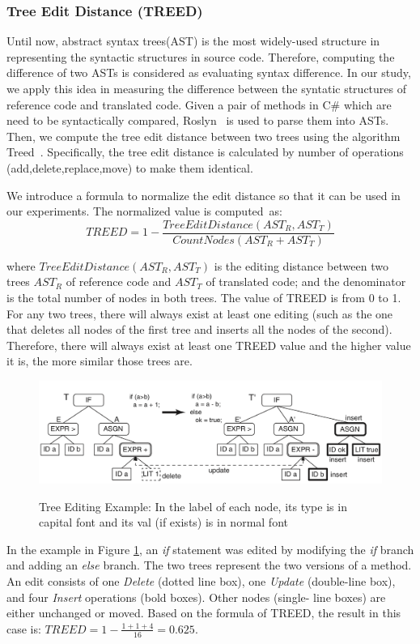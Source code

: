 \subsubsection{\textbf{Tree Edit Distance (TREED)}}  
Until now, abstract syntax trees(AST) is the most widely-used
structure in representing the syntactic structures in source
code. Therefore, computing the difference of two ASTs is considered as
evaluating syntax difference.  In our study, we apply this idea in
measuring the difference between the syntatic structures of reference
code and translated code. Given a pair of methods in C\# which are
need to be syntactically compared, Roslyn~\cite{tien} is used to parse
them into ASTs. Then, we compute the tree edit distance between two
trees using the algorithm Treed~\cite{oopsla10}.  Specifically, the
tree edit distance is calculated by number of operations
(add,delete,replace,move) to make them identical.

We introduce a formula to normalize the edit distance so that it can
be used in our experiments. The normalized value is computed~as:
\[TREED = 1 -  \frac{TreeEditDistance\left(AST_R, AST_T\right)}{CountNodes \left(AST_R+AST_T\right)}\] 
  
where $TreeEditDistance\left(AST_R, AST_T\right)$ is the editing
distance between two trees $AST_R$ of reference code and $AST_T$ of
translated code; and the denominator is the total number of nodes in
both trees. The value of TREED is from 0 to 1.
%
For any two trees, there will always exist at least one editing (such
as the one that deletes all nodes of the first tree and inserts all
the nodes of the second). Therefore, there will always exist at least
one TREED value and the higher value it is, the more similar those
trees are.

\begin{figure}[h]
	\caption{Tree Editing Example: In the label of each node, its type is in capital font and its val (if exists) is in normal font}
	\includegraphics[scale=0.3]{img/treed.png}
	\centering
	\label{fig:treed}
\end{figure}

In the example in Figure \ref{fig:treed}, an \textit{if} statement was
edited by modifying the \textit{if} branch and adding an \textit{else}
branch. The two trees represent the two versions of a method. An edit
consists of one \textit{Delete} (dotted line box), one \textit{Update}
(double-line box), and four \textit{Insert} operations (bold
boxes). Other nodes (single- line boxes) are either unchanged or
moved. Based on the formula of TREED, the result in this case is:
$TREED = 1 - \frac{1 + 1 + 4}{16}=0.625$.



